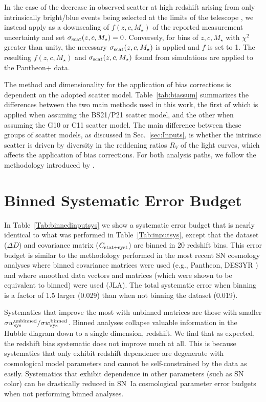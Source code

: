 \documentclass[twocolumn]{aastex63}
\begin{document}
{In the case of the decrease in observed scatter at high redshift arising from} only intrinsically bright/blue events being selected at the limits of the telescope \citep{Kessler2015}, we instead apply as a downscaling of $f(z,c,M_\star)$ of the reported measurement uncertainty and set $\sigma_{\rm scat}(z,c,M_\star)=0$. Conversely, for bins of $z,c,M_\star$ with $\chi^2$ greater than unity, the necessary $\sigma_{\rm scat}(z,c,M_\star)$ is applied and $f$ is set to 1. The resulting $f(z,c,M_\star)$ and $\sigma_{\rm scat}(z,c,M_\star)$ found from simulations are applied to the Pantheon+ data.

{The method and dimensionality for the application of bias corrections is dependent on the adopted scatter model.} Table~\ref{tab:biassum} summarizes the differences between the two main methods used in this work, the first of which is applied when assuming the BS21/P21 scatter model, and the other when assuming the G10 or C11 scatter model.  The main difference between these groups of scatter models, as discussed in Sec.~\ref{sec:Inputs}, is whether the intrinsic scatter is driven by diversity in the reddening ratios $R_V$ of the light curves, which affects the application of bias corrections.  For both analysis paths, we follow the methodology introduced by \cite{popovic21a}.


\section{Binned Systematic Error Budget}
\label{appendix:binnedsys}
In Table~\ref{Tab:binnedinputsys} we show a systematic error budget that is nearly identical to what was performed in Table~\ref{Tab:inputsys}, except that the dataset ($\Delta D$) and covariance matrix ($C_{\rm stat+syst}$) are binned in 20 redshift bins. This error budget is similar to the methodology performed in the most recent SN cosmology analyses where binned covariance matrices were used (e.g., Pantheon, DES3YR \citealt{Brout18b}) and where smoothed data vectors and matrices (which were shown to be equivalent to binned) were used (JLA). The total systematic error when binning is a factor of 1.5 larger (0.029) than when not binning the dataset (0.019).

Systematics that improve the most with unbinned matrices are those with smaller $\sigma w^{\rm unbinned}_{\rm sys}/\sigma w^{\rm binned}_{\rm sys}$. Binned analyses collapse valuable information in the Hubble diagram down to a single dimension, redshift. We find that as expected, the redshift bias systematic does not improve much at all. This is because systematics that only exhibit redshift dependence are degenerate with cosmological model parameters and cannot be self-constrained by the data as easily. Systematics that exhibit dependence in other parameters (such as SN color) can be drastically reduced in SN~Ia cosmological parameter error budgets when not performing binned analyses.
\end{document}
